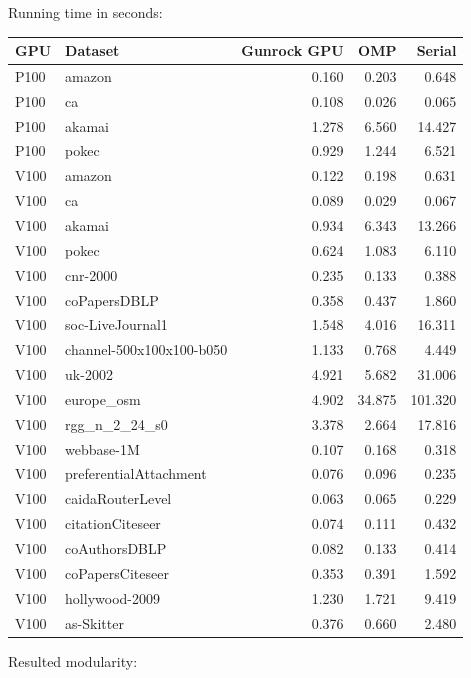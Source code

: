 \documentclass[10pt,article,oneside]{memoir}
\begin{document}
Running time in seconds:

\begin{longtable}[c]{@{}llrrr@{}}
\toprule
GPU & Dataset & Gunrock GPU & OMP & Serial\tabularnewline
\midrule
\endhead
P100 & amazon & 0.160 & 0.203 & 0.648\tabularnewline
P100 & ca & 0.108 & 0.026 & 0.065\tabularnewline
P100 & akamai & 1.278 & 6.560 & 14.427\tabularnewline
P100 & pokec & 0.929 & 1.244 & 6.521\tabularnewline
V100 & amazon & 0.122 & 0.198 & 0.631\tabularnewline
V100 & ca & 0.089 & 0.029 & 0.067\tabularnewline
V100 & akamai & 0.934 & 6.343 & 13.266\tabularnewline
V100 & pokec & 0.624 & 1.083 & 6.110\tabularnewline
V100 & cnr-2000 & 0.235 & 0.133 & 0.388\tabularnewline
V100 & coPapersDBLP & 0.358 & 0.437 & 1.860\tabularnewline
V100 & soc-LiveJournal1 & 1.548 & 4.016 & 16.311\tabularnewline
V100 & channel-500x100x100-b050 & 1.133 & 0.768 & 4.449\tabularnewline
V100 & uk-2002 & 4.921 & 5.682 & 31.006\tabularnewline
V100 & europe\_osm & 4.902 & 34.875 & 101.320\tabularnewline
V100 & rgg\_n\_2\_24\_s0 & 3.378 & 2.664 & 17.816\tabularnewline
V100 & webbase-1M & 0.107 & 0.168 & 0.318\tabularnewline
V100 & preferentialAttachment & 0.076 & 0.096 & 0.235\tabularnewline
V100 & caidaRouterLevel & 0.063 & 0.065 & 0.229\tabularnewline
V100 & citationCiteseer & 0.074 & 0.111 & 0.432\tabularnewline
V100 & coAuthorsDBLP & 0.082 & 0.133 & 0.414\tabularnewline
V100 & coPapersCiteseer & 0.353 & 0.391 & 1.592\tabularnewline
V100 & hollywood-2009 & 1.230 & 1.721 & 9.419\tabularnewline
V100 & as-Skitter & 0.376 & 0.660 & 2.480\tabularnewline
\bottomrule
\end{longtable}

Resulted modularity:
\end{document}
